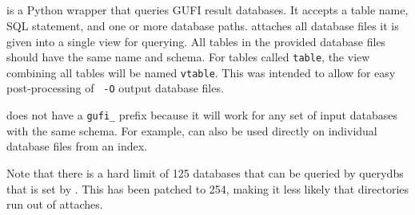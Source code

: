 \subsection{\querydbs}
\querydbs is a Python wrapper that queries GUFI result databases. It
accepts a table name, SQL statement, and one or more database paths.
\querydbs attaches all database files it is given into a single view
for querying. All tables in the provided database files should have
the same name and schema. For tables called \texttt{table}, the view
combining all tables will be named \texttt{vtable}. This was intended
to allow for easy post-processing of \gufiquery~\texttt{-O} output
database files.

\querydbs does not have a \texttt{gufi\_} prefix because it will work
for any set of input databases with the same schema. For example,
\querydbs can also be used directly on individual database files
from an index.

Note that there is a hard limit of 125 databases that can be queried
by querydbs that is set by \sqlite. This has been patched to 254,
making it less likely that directories run out of attaches.
